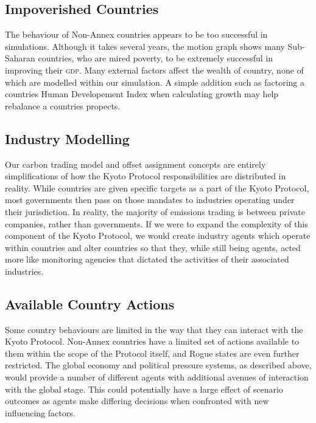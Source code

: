 \subsection{Impoverished Countries}

The behaviour of Non-Annex countries appears to be too successful in simulations.  Although it takes several years, the motion graph shows many Sub-Saharan countries, who are mired poverty, to be extremely successful in improving their \textsc{gdp}. Many external factors affect the wealth of country, none of which are modelled within our simulation.  A simple addition such as factoring a countries Human Developement Index when calculating growth may help rebalance a countries propects.
 
\subsection{Industry Modelling}

Our carbon trading model and offset assignment concepts are entirely simplifications of how the Kyoto Protocol responsibilities are distributed in reality. While countries are given specific targets as a part of the Kyoto Protocol, most governments then pass on those mandates to industries operating under their jurisdiction. In reality, the majority of emissions trading is between private companies, rather than governments. If we were to expand the complexity of this component of the Kyoto Protocol, we would create industry agents which operate within countries and alter countries so that they, while still being agents, acted more like monitoring agencies that dictated the activities of their associated industries.

\subsection{Available Country Actions}

Some country behaviours are limited in the way that they can interact with the Kyoto Protocol. Non-Annex countries have a limited set of actions available to them within the scope of the Protocol itself, and Rogue states are even further restricted. The global economy and political pressure systems, as described above, would provide a number of different agents with additional avenues of interaction with the global stage. This could potentially have a large effect of scenario outcomes as agents make differing decisions when confronted with new influencing factors.

